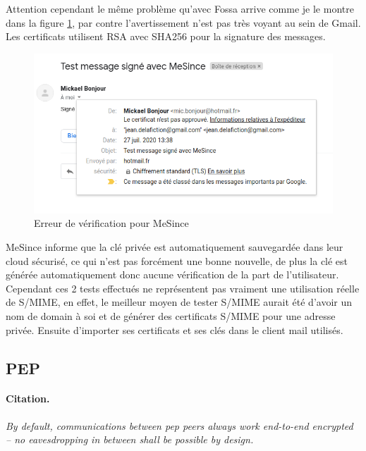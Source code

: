 Attention cependant le même problème qu'avec Fossa arrive comme je le montre dans la figure \ref{fig:SMIME_MeSinceProblem}, par contre l'avertissement n'est pas très voyant au sein de Gmail. Les certificats utilisent RSA avec SHA256 pour la signature des messages.
\begin{figure}[h!]
	\includegraphics[width=15cm]{images/mesince_problem.png}
	\centering
	\caption{Erreur de vérification pour MeSince}
	\label{fig:SMIME_MeSinceProblem}
\end{figure}
 
 MeSince informe que la clé privée est automatiquement sauvegardée dans leur cloud sécurisé, ce qui n'est pas forcément une bonne nouvelle, de plus la clé est générée automatiquement donc aucune vérification de la part de l'utilisateur.
 Cependant ces 2 tests effectués ne représentent pas vraiment une utilisation réelle de S/MIME, en effet, le meilleur moyen de tester S/MIME aurait été d'avoir un nom de domain à soi et de générer des certificats S/MIME pour une adresse privée. Ensuite d'importer ses certificats et ses clés dans le client mail utilisés.
\subsection{PEP}
\paragraph*{Citation.}
\textit{By default, communications between pep peers always work end-to-end encrypted – no eavesdropping in between shall be possible by design.}
